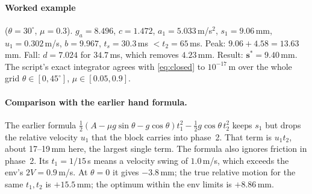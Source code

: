 \documentclass[11pt,a4paper]{article}
\begin{document}
\paragraph{Worked example} ($\theta=30^\circ$, $\mu=0.3$).
$g_a=8.496$, $c=1.472$, $a_1=5.033$\,m/s$^2$, $s_1=9.06$\,mm, $u_1=0.302$\,m/s, $b=9.967$, $t_s=30.3$\,ms $<t_2=65$\,ms.
Peak: $9.06+4.58=13.63$\,mm. Fall: $d=7.024$ for $34.7$\,ms, which removes $4.23$\,mm.
Result: $\mathbf{s^*=9.40}$\,mm. The script's exact integrator agrees with \eqref{eq:closed} to $10^{-17}$\,m over the
whole grid $\theta\in[0,45^\circ]$, $\mu\in[0.05,0.9]$.

\paragraph{Comparison with the earlier hand formula.}
The earlier formula $\tfrac12(A-\mu g\sin\theta-g\cos\theta)t_1^2-\tfrac12 g\cos\theta\,t_2^2$ keeps $s_1$ but drops the
relative velocity $u_1$ that the block carries into phase~2. That term is $u_1t_2$, about 17--19\,mm here, the largest
single term. The formula also ignores friction in phase~2. Its $t_1=1/15$\,s means a velocity swing of $1.0$\,m/s,
which exceeds the env's $2V=0.9$\,m/s. At $\theta=0$ it gives $-3.8$\,mm; the true relative motion for the same
$t_1,t_2$ is $+15.5$\,mm; the optimum within the env limits is $+8.86$\,mm.
\end{document}
